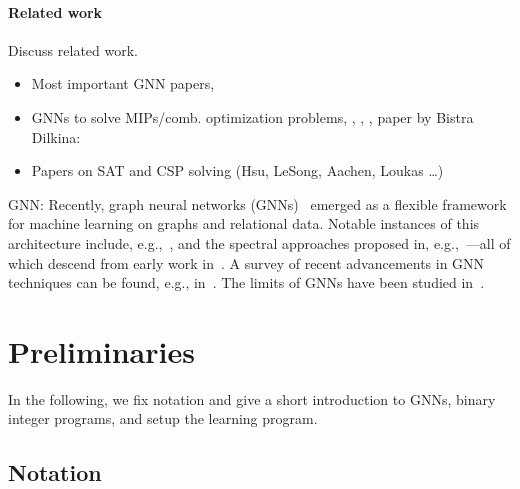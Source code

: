 \documentclass[11pt, DIV=12]{scrartcl}
\theoremstyle{definition}
\begin{document}
\paragraph{Related work} Discuss related work.
\begin{itemize}
	\item Most important GNN papers, 
	\item GNNs to solve MIPs/comb. optimization problems, \cite{Li+2018b}, \cite{Vel+2020}, \cite{Gasse+2019} \cite{Gup+2020} \cite{Kha+2016}, paper by Bistra Dilkina: 
	\item Papers on SAT and CSP solving (Hsu, LeSong, Aachen, Loukas \dots) \cite{Sel+2019}
\end{itemize}
 

GNN: Recently, graph neural networks (GNNs)~\cite{Gil+2017,Sca+2009} emerged as a flexible framework for machine learning on graphs and relational data. Notable instances of this architecture include, e.g.,~\cite{Duv+2015,Ham+2017,Vel+2018}, and the spectral approaches proposed in, e.g.,~\cite{Bru+2014,Def+2015,Kip+2017,Mon+2017}---all of which descend from early work in~\cite{Kir+1995,Mer+2005,Spe+1997,Sca+2009}. A survey of recent advancements in GNN techniques can be found, e.g., in~\cite{Cha+2020,Wu+2019,Zho+2018}. The limits of GNNs have been studied in~\cite{Bar+2020,Che+2019,Mae+2019,Mar+2019,Mor+2019,Xu+2018b}.


\section{Preliminaries}

In the following, we fix notation and give a short introduction to GNNs, binary integer programs, and setup the learning program.

\subsection{Notation}
\end{document}
